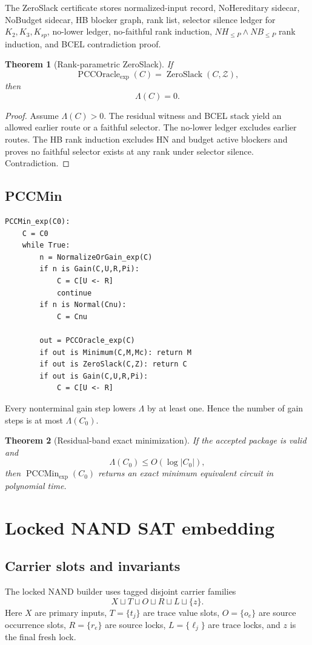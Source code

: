 \documentclass[10.5pt,a4paper]{article}
\newtheorem{theorem}{Theorem}[section]
\newcommand{\PCCOracle}{\operatorname{PCCOracle}_{\exp}}
\newcommand{\PCCMin}{\operatorname{PCCMin}_{\exp}}
\newcommand{\ZeroSlack}{\operatorname{ZeroSlack}}
\begin{document}
The ZeroSlack certificate stores normalized-input record, NoHereditary sidecar, NoBudget sidecar, HB blocker graph, rank list, selector silence ledger for \(K_2,K_3,K_{sp}\), no-lower ledger, no-faithful rank induction, \(NH_{\le P}\wedge NB_{\le P}\) rank induction, and BCEL contradiction proof.

\begin{theorem}[Rank-parametric ZeroSlack]
If
\[
\PCCOracle(C)=\ZeroSlack(C,\mathcal Z),
\]
then
\[
\Lambda(C)=0.
\]
\end{theorem}

\begin{proof}
Assume \(\Lambda(C)>0\). The residual witness and BCEL stack yield an allowed earlier route or a faithful selector. The no-lower ledger excludes earlier routes. The HB rank induction excludes HN and budget active blockers and proves no faithful selector exists at any rank under selector silence. Contradiction.
\end{proof}

\subsection{PCCMin}
\begin{lstlisting}
PCCMin_exp(C0):
    C = C0
    while True:
        n = NormalizeOrGain_exp(C)
        if n is Gain(C,U,R,Pi):
            C = C[U <- R]
            continue
        if n is Normal(Cnu):
            C = Cnu

        out = PCCOracle_exp(C)
        if out is Minimum(C,M,Mc): return M
        if out is ZeroSlack(C,Z): return C
        if out is Gain(C,U,R,Pi):
            C = C[U <- R]
\end{lstlisting}

Every nonterminal gain step lowers \(\Lambda\) by at least one. Hence the number of gain steps is at most \(\Lambda(C_0)\).

\begin{theorem}[Residual-band exact minimization]
If the accepted package is valid and
\[
\Lambda(C_0)\le O(\log |C_0|),
\]
then \(\PCCMin(C_0)\) returns an exact minimum equivalent circuit in polynomial time.
\end{theorem}

\section{Locked NAND SAT embedding}

\subsection{Carrier slots and invariants}
The locked NAND builder uses tagged disjoint carrier families
\[
X\sqcup T\sqcup O\sqcup R\sqcup L\sqcup\{z\}.
\]
Here \(X\) are primary inputs, \(T=\{t_j\}\) are trace value slots, \(O=\{o_e\}\) are source occurrence slots, \(R=\{r_e\}\) are source locks, \(L=\{\ell_j\}\) are trace locks, and \(z\) is the final fresh lock.
\end{document}
